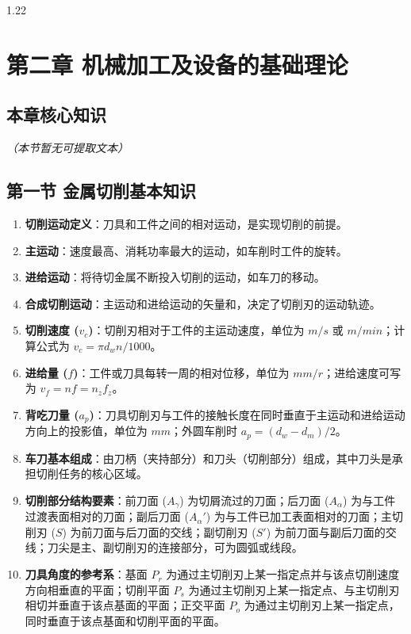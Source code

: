 \documentclass[12pt,a4paper]{article}
\begin{document}
\begin{spacing}{1.22}
\section{第二章 机械加工及设备的基础理论}
\subsection{本章核心知识}
\textit{（本节暂无可提取文本）}

\subsection{第一节 金属切削基本知识}
\begin{tcolorbox}[colback=yellow!6,colframe=red!55!black,title=重点,left=1mm,right=1mm]
\begin{enumerate}[leftmargin=2.2em,label=\arabic*.]
  \item \textbf{切削运动定义}：刀具和工件之间的相对运动，是实现切削的前提。
  \item \textbf{主运动}：速度最高、消耗功率最大的运动，如车削时工件的旋转。
  \item \textbf{进给运动}：将待切金属不断投入切削的运动，如车刀的移动。
  \item \textbf{合成切削运动}：主运动和进给运动的矢量和，决定了切削刃的运动轨迹。
  \item \textbf{切削速度 ($v_c$)}：切削刃相对于工件的主运动速度，单位为 $m/s$ 或 $m/min$；计算公式为 $v_c=\pi d_w n / 1000$。
  \item \textbf{进给量 ($f$)}：工件或刀具每转一周的相对位移，单位为 $mm/r$；进给速度可写为 $v_f=nf=n_zf_z$。
  \item \textbf{背吃刀量 ($a_p$)}：刀具切削刃与工件的接触长度在同时垂直于主运动和进给运动方向上的投影值，单位为 $mm$；外圆车削时 $a_p=(d_w-d_m)/2$。
  \item \textbf{车刀基本组成}：由刀柄（夹持部分）和刀头（切削部分）组成，其中刀头是承担切削任务的核心区域。
  \item \textbf{切削部分结构要素}：前刀面 ($A_\gamma$) 为切屑流过的刀面；后刀面 ($A_\alpha$) 为与工件过渡表面相对的刀面；副后刀面 ($A_\alpha'$) 为与工件已加工表面相对的刀面；主切削刃 ($S$) 为前刀面与后刀面的交线；副切削刃 ($S'$) 为前刀面与副后刀面的交线；刀尖是主、副切削刃的连接部分，可为圆弧或线段。
  \item \textbf{刀具角度的参考系}：基面 $P_r$ 为通过主切削刃上某一指定点并与该点切削速度方向相垂直的平面；切削平面 $P_s$ 为通过主切削刃上某一指定点、与主切削刃相切并垂直于该点基面的平面；正交平面 $P_o$ 为通过主切削刃上某一指定点，同时垂直于该点基面和切削平面的平面。

\end{enumerate}
\end{tcolorbox}
\end{spacing}
\end{document}

